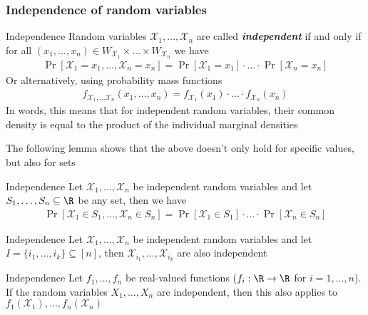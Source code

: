 \subsubsection{Independence of random variables}
\setcounter{all}{52}
\begin{definition}[]{Independence}
    Random variables $\mathcal{X}_1, \ldots, \mathcal{X}_n$ are called \textbf{\textit{independent}}
    if and only if for all $(x_1, \ldots, x_n) \in W_{\mathcal{X}_1} \times \ldots \times W_{\mathcal{X}_n}$ we have
    \begin{align*}
        \Pr[\mathcal{X}_1 = x_1, \ldots, \mathcal{X}_n = x_n] = \Pr[\mathcal{X}_1 = x_1] \cdot \ldots \cdot \Pr[\mathcal{X}_n = x_n]
    \end{align*}
    Or alternatively, using probability mass functions
    \begin{align*}
        f_{\mathcal{X}_1, \ldots \mathcal{X}_n}(x_1, \ldots, x_n) = f_{\mathcal{X}_1}(x_1) \cdot \ldots \cdot f_{\mathcal{X}_n}(x_n)
    \end{align*}
    In words, this means that for independent random variables, their common density is equal to the product of the individual marginal densities
\end{definition}
The following lemma shows that the above doesn't only hold for specific values, but also for sets
\begin{lemma}[]{Independence}
    Let $\mathcal{X}_1, \ldots, \mathcal{X}_n$ be independent random variables and let $S_1, \ldots, S_n \subseteq \R$ be any set, then we have
    \begin{align*}
        \Pr[\mathcal{X}_1 \in S_1, \ldots, \mathcal{X}_n \in S_n] = \Pr[\mathcal{X}_1 \in S_1] \cdot \ldots \cdot \Pr[\mathcal{X}_n \in S_n]
    \end{align*}
\end{lemma}

\begin{corollary}[]{Independence}
    Let $\mathcal{X}_1, \ldots, \mathcal{X}_n$ be independent random variables and let $I = \{i_1, \ldots, i_k\} \subseteq [n]$, then $\mathcal{X}_{i_1}, \ldots, \mathcal{X}_{i_k}$ are also independent
\end{corollary}

\begin{theorem}[]{Independence}
    Let $f_1, \ldots, f_n$ be real-valued functions ($f_i : \R \rightarrow \R$ for $i = 1, \ldots, n$). If the random variables $X_1, \ldots, X_n$ are independent, then this also applies to $f_1(\mathcal{X}_1), \ldots, f_n(\mathcal{X}_n)$
\end{theorem}


